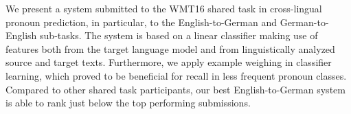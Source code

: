 We present a system submitted to the WMT16 shared task in cross-lingual pronoun prediction, in particular, to the English-to-German and German-to-English sub-tasks. The system is based on a linear classifier making use of features both from the target language model and from linguistically analyzed source and target texts. Furthermore, we apply example weighing in classifier learning, which proved to be beneficial for recall in less frequent pronoun classes. Compared to other shared task participants, our best English-to-German system is able to rank just below the top performing submissions.
